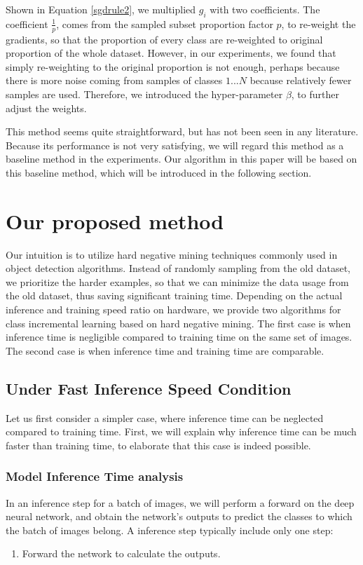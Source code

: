 Shown in Equation \ref{sgdrule2}, we multiplied $g_i$ with two coefficients. The coefficient $\frac{1}{p}$, comes from the sampled subset proportion factor $p$, to re-weight the gradients, so that the proportion of every class are re-weighted to original proportion of the whole dataset. However, in our experiments, we found that simply re-weighting to the original proportion is not enough, perhaps because there is more noise coming from samples of classes $1...N$ because relatively fewer samples are used. Therefore, we introduced the hyper-parameter $\beta$, to further adjust the weights.

This method seems quite straightforward, but has not been seen in any literature. Because its performance is not very satisfying, we will regard this method as a baseline method in the experiments. Our algorithm in this paper will be based on this baseline method, which will be introduced in the following section.
\label{baselinesection}

\section{Our proposed method}

Our intuition is to utilize hard negative mining techniques commonly used in object detection algorithms. Instead of randomly sampling from the old dataset, we prioritize the harder examples, so that we can minimize the data usage from the old dataset, thus saving significant training time. Depending on the actual inference and training speed ratio on hardware, we provide two algorithms for class incremental learning based on hard negative mining. The first case is when inference time is negligible compared to training time on the same set of images. The second case is when inference time and training time are comparable.

\subsection{Under Fast Inference Speed Condition}
Let us first consider a simpler case, where inference time can be neglected compared to training time. First, we will explain why inference time can be much faster than training time, to elaborate that this case is indeed possible.
\subsubsection{Model Inference Time analysis}
In an inference step for a batch of images, we will perform a forward on the deep neural network, and obtain the network's outputs to predict the classes to which the batch of images belong. A inference step typically include only one step:
\begin{enumerate}
	\item  Forward the network to calculate the outputs.
\end{enumerate}


